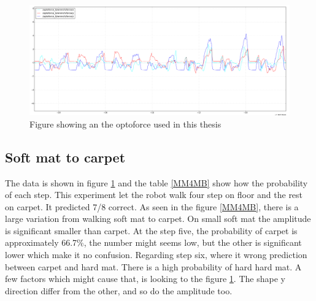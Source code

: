 \documentclass[USenglish]{ifimaster}  %
\begin{document}
\begin{figure}[h]
    \centering
    \includegraphics[width=\textwidth,height=\textheight,keepaspectratio]{Figures/MM_4Resten_MB}
    \caption{Figure showing an the optoforce used in this thesis \cite{OptoforceFig}}
    \label{fig:MM_4_Resten_BGraf}
\end{figure}

\begin{table}[h]
\centering
{}
\caption{MM 4Resten MBNY}
\label{MM4MB}
\end{table}
\FloatBarrier
\subsection{Soft mat to carpet}
The data is shown in figure \ref{fig:MM_4_Resten_BGraf} and the table \ref{MM4MB} show how the probability of each step. This experiment let the robot walk four step on floor and the rest on carpet. It predicted 7/8 correct. As seen in the figure \ref{MM4MB}, there is a large variation from walking soft mat to carpet. On small soft mat the amplitude is significant smaller than carpet. At the step five, the probability of carpet is approximately 66.7\%, the number might seems low, but the other is significant lower which make it no confusion. Regarding step six, where it wrong prediction between carpet and hard mat. There is a high probability of hard hard mat. A few factors which might cause that, is looking to the figure \ref{fig:MM_4_Resten_BGraf}. The shape y direction differ from the other, and so do the amplitude too.
\end{document}
